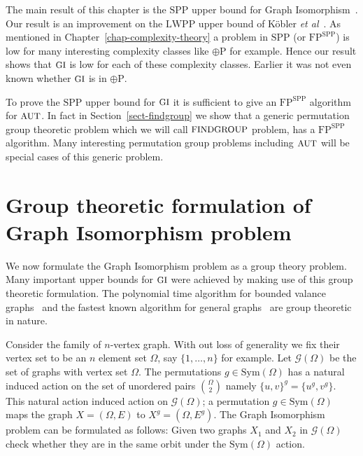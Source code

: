 \documentclass[11pt]{madras}%
\theoremstyle{remark}
\newcommand{\Sym}[1]{{\ensuremath{\mathrm{Sym}\left(#1\right)}}}
\newcommand{\etal}[0]{{\emph{et al}}}
\newcommand{\ProblemFont}[1]{{\ensuremath{\textrm{\small #1}}}}
\begin{document}
The main result of this chapter is the $\mathrm{SPP}$ upper bound for
Graph Isomorphism~\cite{arvind2002graph}. Our result is an improvement
on the $\mathrm{LWPP}$ upper bound of K\"obler
\etal~\cite{kobler92graph}. As mentioned in
Chapter~\ref{chap-complexity-theory} a problem in $\mathrm{SPP}$ (or
$\mathrm{FP}^{\mathrm{SPP}}$) is low for many interesting complexity
classes like $\oplus \mathrm{P}$ for example. Hence our result shows
that $\ProblemFont{GI}$ is low for each of these complexity classes.
Earlier it was not even known whether $\ProblemFont{GI}$ is in $\oplus
\mathrm{P}$.

To prove the $\mathrm{SPP}$ upper bound for $\ProblemFont{GI}$ it is
sufficient to give an $\mathrm{FP}^{\mathrm{SPP}}$ algorithm for
$\ProblemFont{AUT}$. In fact in Section~\ref{sect-findgroup} we show
that a generic permutation group theoretic problem which we will call
$\ProblemFont{FINDGROUP}$ problem, has a $\mathrm{FP}^{\mathrm{SPP}}$
algorithm. Many interesting permutation group problems including
$\ProblemFont{AUT}$ will be special cases of this generic problem.


\section{Group theoretic formulation of Graph Isomorphism problem}
\label{sect-gi-group-formulation}

We now formulate the Graph Isomorphism problem as a group theory
problem. Many important upper bounds for $\ProblemFont{GI}$ were
achieved by making use of this group theoretic formulation. The
polynomial time algorithm for bounded valance
graphs~\cite{luks82bounded} and the fastest known algorithm for
general graphs~\cite{zemlyachenko85gi,babai83canonical} are group
theoretic in nature.


Consider the family of $n$-vertex graph. With out loss of generality
we fix their vertex set to be an $n$ element set $\Omega$, say
$\{1,\ldots,n\}$ for example. Let $\mathcal{G}(\Omega)$ be the set of
graphs with vertex set $\Omega$. The permutations $g \in \Sym{\Omega}$
has a natural induced action on the set of unordered pairs $\Omega
\choose 2$ namely $\{ u, v\}^g = \{u^g, v^g\}$. This natural action
induced action on $\mathcal{G}(\Omega)$; a permutation $g \in
\Sym{\Omega}$ maps the graph $X = (\Omega,E)$ to $X^g = (\Omega,E^g)$.
The Graph Isomorphism problem can be formulated as follows: Given two
graphs $X_1$ and $X_2$ in $\mathcal{G}(\Omega)$ check whether they are
in the same orbit under the $\Sym{\Omega}$ action.
\end{document}
